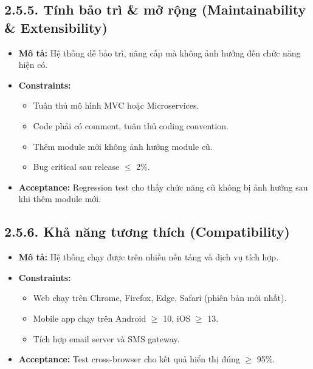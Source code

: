 
\subsection*{2.5.5. Tính bảo trì \& mở rộng (Maintainability \& Extensibility)}
\begin{itemize}
    \item \textbf{Mô tả:} Hệ thống dễ bảo trì, nâng cấp mà không ảnh hưởng đến chức năng hiện có.
    \item \textbf{Constraints:}
    \begin{itemize}
        \item Tuân thủ mô hình MVC hoặc Microservices.
        \item Code phải có comment, tuân thủ coding convention.
        \item Thêm module mới không ảnh hưởng module cũ.
        \item Bug critical sau release $\leq$ 2\%.
    \end{itemize}
    \item \textbf{Acceptance:} Regression test cho thấy chức năng cũ không bị ảnh hưởng sau khi thêm module mới.
\end{itemize}


\subsection*{2.5.6. Khả năng tương thích (Compatibility)}
\begin{itemize}
    \item \textbf{Mô tả:} Hệ thống chạy được trên nhiều nền tảng và dịch vụ tích hợp.
    \item \textbf{Constraints:}
    \begin{itemize}
        \item Web chạy trên Chrome, Firefox, Edge, Safari (phiên bản mới nhất).
        \item Mobile app chạy trên Android $\geq$ 10, iOS $\geq$ 13.
        \item Tích hợp email server và SMS gateway.
    \end{itemize}
    \item \textbf{Acceptance:} Test cross-browser cho kết quả hiển thị đúng $\geq$ 95\%.
\end{itemize}

